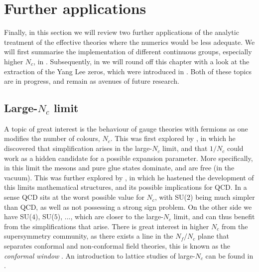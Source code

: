 \section{Further applications}

Finally, in this section we will review two further applications of the analytic
treatment of the effective theories where the numerics would be less adequate.
We will first summarise the implementation of different continuous groups,
especially higher $N_c$, in . Subsequently, in
 we will round off this chapter with a look at the
extraction of the Yang Lee zeros, which were introduced in
. Both of these topics are in progress, and
remain as avenues of future research.

\subsection{Large-\texorpdfstring{$N_c$}{Nc} limit} \label{sec:large_nc_study}

A topic of great interest is the behaviour of gauge theories with
fermions as one modifies the number of colours, $N_c$. This was first explored
by \cite{'tHooft:1973jz}, in which he discovered that simplification arises in
the large-$N_c$ limit, and that $1/N_c$ could work as a hidden candidate for a
possible expansion parameter. More specifically, in this limit the mesons and
pure glue states dominate, and are free (in the vacuum). This was further
explored by \cite{Witten:1979kh}, in which he hastened the development of this
limits mathematical structures, and its possible implications for QCD. In a
sense QCD sits at the worst possible value for $N_c$, with SU($2$) being much
simpler than QCD, as well as not possessing a strong sign problem. On the other
side we have SU($4$), SU($5$), ..., which are closer to the large-$N_c$ limit,
and can thus benefit from the simplifications that arise. There is great
interest in higher $N_c$ from the supersymmetry community, as there exists a
line in the $N_f \big/ N_c$ plane that separates conformal and non-conformal
field theories, this is known as the \emph{conformal window}
\citep{Dietrich:2006cm}. An introduction to lattice studies of large-$N_c$ can
be found in \citep{Lucini:2013qja}.

